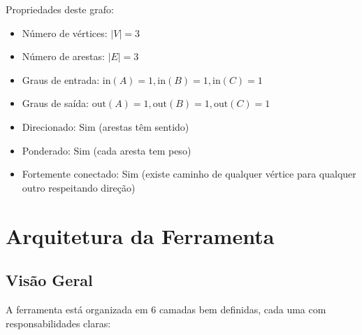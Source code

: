 \documentclass[12pt,a4paper]{article}
\begin{document}
Propriedades deste grafo:
\begin{itemize}
  \item Número de vértices: $|V| = 3$
  \item Número de arestas: $|E| = 3$
  \item Graus de entrada: $\text{in}(A)=1, \text{in}(B)=1, \text{in}(C)=1$
  \item Graus de saída: $\text{out}(A)=1, \text{out}(B)=1, \text{out}(C)=1$
  \item Direcionado: Sim (arestas têm sentido)
  \item Ponderado: Sim (cada aresta tem peso)
  \item Fortemente conectado: Sim (existe caminho de qualquer vértice para qualquer outro respeitando direção)
\end{itemize}

\section{Arquitetura da Ferramenta}\label{sec:arquitetura}

\subsection{Visão Geral}

A ferramenta está organizada em 6 camadas bem definidas, cada uma com responsabilidades claras:
\end{document}
